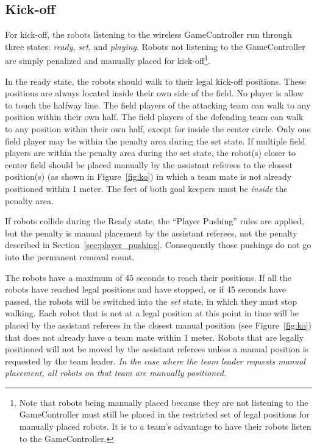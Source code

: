 \documentclass[12pt]{article}
\newcommand{\KickOffAutoTime}{45 seconds\xspace}
\begin{document}
\subsection{Kick-off}
\label{sec:kick-off}
For kick-off, the robots listening to the wireless GameController run through three states: \emph{ready}, \emph{set}, and \emph{playing}. Robots not listening to the GameController are simply penalized and manually placed for kick-off\footnote{Note that robots being manually placed because they are not listening to the GameController must still be placed in the restricted set of legal positions for manually placed robots. It is to a team's advantage to have their robots listen to the GameController.}.

In the ready state, the robots should walk to their legal kick-off positions. These positions are always located inside their own side of the field. No player is allow to touch the halfway line.
The field players of the attacking team can walk to any position within their own half.
The field players of the defending team can walk to any position within their own half, except for inside the center circle.  Only one field player may be within the penalty area during the set state.  If multiple field players are within the penalty area during the set state, the robot(s) closer to center field should be placed manually by the assistant referees to the closest position(s) (as shown in Figure~\ref{fig:ko}) in which a team mate is not already positioned within 1 meter.
The feet of both goal keepers must be \emph{inside} the penalty area.

If robots collide during the Ready state, the ``Player Pushing'' rules are applied, but the penalty is manual placement by the assistant referees, not the penalty described in Section~\ref{sec:player_pushing}.
Consequently those pushings do not go into the permanent removal count.

The robots have a maximum of \KickOffAutoTime to reach their positions. If all the robots have reached legal positions and have stopped, or if \KickOffAutoTime have passed, the robots will be switched into the \emph{set} state, in which they must stop walking. Each robot that is not at a legal position at this point in time will be placed by the assistant referees in the closest manual position (see Figure~\ref{fig:ko}) that does not already have a team mate within 1 meter.
Robots that are legally positioned will not be moved by the assistant referees unless a manual position is requested by the team leader.
\emph{In the case where the team leader requests manual placement, all robots on that team are manually positioned.}
\end{document}
